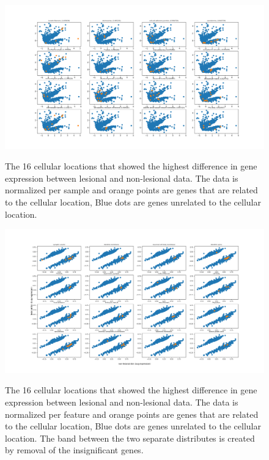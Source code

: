 \documentclass[10pt,a4paper]{article}
\begin{document}
	\begin{figure}[H]
		\includegraphics[width=1\textwidth]{Sign_Organelles_Psoriasis.png}
		\label{fig:CellularScaledBySample}
		\caption{The 16 cellular locations that showed the highest difference in gene expression between lesional and non-lesional data. The data is normalized per sample and orange points are genes that are related to the cellular location, Blue dots are genes unrelated to the cellular location.}
	\end{figure}

	\begin{figure}[H]
		\includegraphics[width=1\textwidth]{Sign_Organelles_Psoriasis_Scaled.png}
		\label{fig:CellularScaledByFeature1}
		\caption{The 16 cellular locations that showed the highest difference in gene expression between lesional and non-lesional data. The data is normalized per feature and orange points are genes that are related to the cellular location, Blue dots are genes unrelated to the cellular location. The band between the two separate distributes is created by removal of the insignificant genes.}
	\end{figure}
\end{document}
